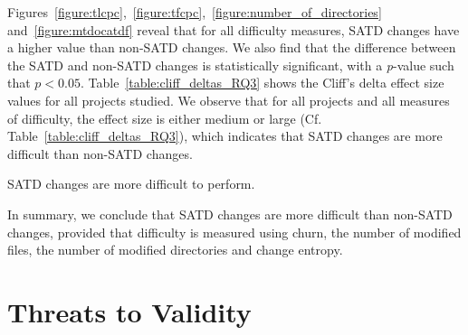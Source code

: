  Figures~\ref{figure:tlcpc},~\ref{figure:tfcpc},~\ref{figure:number_of_directories} and~\ref{figure:mtdocatdf} reveal that for all difficulty measures, SATD changes have a higher value than non-SATD changes. We also find that the difference between the SATD and non-SATD changes is statistically significant, with a \textit{p}-value such that $p < 0.05$. Table~\ref{table:cliff_deltas_RQ3} shows the Cliff's delta effect size values for all projects studied. We observe that for all projects and all measures of difficulty, the effect size is either medium or large (Cf. Table~\ref{table:cliff_deltas_RQ3}), which indicates that SATD changes are more difficult than non-SATD changes.

\begin{myboxii}
	SATD changes are more difficult to perform.
\end{myboxii}


In summary, we conclude that SATD changes are more difficult than non-SATD changes, provided that difficulty is measured using churn, the number of modified files, the number of modified directories and change entropy.







\section{Threats to Validity}
\label{chap3:sec:threats_to_validity}

